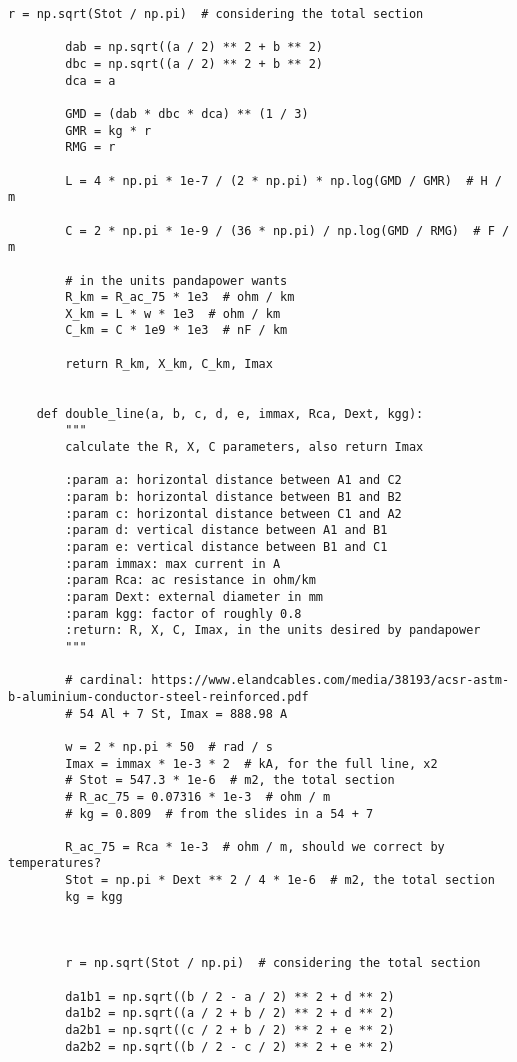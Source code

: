 \begin{lstlisting}[caption={Code for the calculation of lines}]
        r = np.sqrt(Stot / np.pi)  # considering the total section

        dab = np.sqrt((a / 2) ** 2 + b ** 2)
        dbc = np.sqrt((a / 2) ** 2 + b ** 2)
        dca = a

        GMD = (dab * dbc * dca) ** (1 / 3)
        GMR = kg * r
        RMG = r

        L = 4 * np.pi * 1e-7 / (2 * np.pi) * np.log(GMD / GMR)  # H / m

        C = 2 * np.pi * 1e-9 / (36 * np.pi) / np.log(GMD / RMG)  # F / m

        # in the units pandapower wants
        R_km = R_ac_75 * 1e3  # ohm / km
        X_km = L * w * 1e3  # ohm / km
        C_km = C * 1e9 * 1e3  # nF / km

        return R_km, X_km, C_km, Imax


    def double_line(a, b, c, d, e, immax, Rca, Dext, kgg):
        """
        calculate the R, X, C parameters, also return Imax

        :param a: horizontal distance between A1 and C2
        :param b: horizontal distance between B1 and B2
        :param c: horizontal distance between C1 and A2
        :param d: vertical distance between A1 and B1
        :param e: vertical distance between B1 and C1
        :param immax: max current in A
        :param Rca: ac resistance in ohm/km
        :param Dext: external diameter in mm
        :param kgg: factor of roughly 0.8
        :return: R, X, C, Imax, in the units desired by pandapower
        """

        # cardinal: https://www.elandcables.com/media/38193/acsr-astm-b-aluminium-conductor-steel-reinforced.pdf
        # 54 Al + 7 St, Imax = 888.98 A

        w = 2 * np.pi * 50  # rad / s
        Imax = immax * 1e-3 * 2  # kA, for the full line, x2
        # Stot = 547.3 * 1e-6  # m2, the total section
        # R_ac_75 = 0.07316 * 1e-3  # ohm / m
        # kg = 0.809  # from the slides in a 54 + 7

        R_ac_75 = Rca * 1e-3  # ohm / m, should we correct by temperatures?
        Stot = np.pi * Dext ** 2 / 4 * 1e-6  # m2, the total section
        kg = kgg



        r = np.sqrt(Stot / np.pi)  # considering the total section

        da1b1 = np.sqrt((b / 2 - a / 2) ** 2 + d ** 2)
        da1b2 = np.sqrt((a / 2 + b / 2) ** 2 + d ** 2)
        da2b1 = np.sqrt((c / 2 + b / 2) ** 2 + e ** 2)
        da2b2 = np.sqrt((b / 2 - c / 2) ** 2 + e ** 2)


\end{lstlisting}
